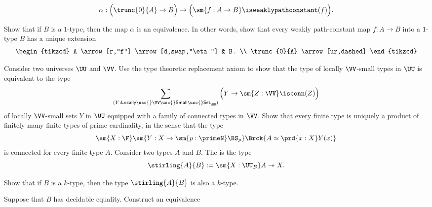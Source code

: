\begin{exercises}
\begin{subexenum}
    \begin{equation*}
      \alpha : \Big(\trunc{0}{A}\to B\Big)\to\Big(\sm{f:A\to B}\isweaklypathconstant(f)\Big).
    \end{equation*}
  \item Show that if $B$ is a $1$-type, then the map $\alpha$ is an equivalence. In other words, show that every weakly path-constant map $f:A\to B$ into a $1$-type $B$ has a unique extension
    \begin{equation*}
      \begin{tikzcd}
        A \arrow[r,"f"] \arrow[d,swap,"\eta"] & B. \\
        \trunc{0}{A} \arrow[ur,dashed]
      \end{tikzcd}
    \end{equation*}
  \end{subexenum}
  \exitem Consider two universes $\UU$ and $\VV$. Use the type theoretic replacement axiom to show that the type of locally $\VV$-small types in $\UU$ is equivalent to the type
  \begin{equation*}
    \sum_{(Y:\mathsf{Locally\usc{}}\VV\mathsf{\usc{}Small\usc{}Set}_\UU)}\Big(Y\to \sm{Z:\VV}\isconn(Z)\Big)
  \end{equation*}
  of locally $\VV$-small sets $Y$ in $\UU$ equipped with a family of connected types in $\VV$.
  \exitem Show that every finite type is uniquely a product of finitely many finite types of prime cardinality, in the sense that the type
  \begin{equation*}
    \sm{X:\F}\sm{Y:X\to\sm{p:\primeN}\BS_p}\Brck{A\simeq\prd{x:X}Y(x)}
  \end{equation*}
  is connected for every finite type $A$.
  \exitem \label{ex:stirling-type-of-the-second-kind}Consider two types $A$ and $B$. The  is the type
  \begin{equation*}
    \stirling{A}{B}:=\sm{X:\UU_B}A\twoheadrightarrow X. 
  \end{equation*}
  \begin{subexenum}
  \item Show that if $B$ is a $k$-type, then the type $\stirling{A}{B}$ is also a $k$-type.
  \item Suppose that $B$ has decidable equality. Construct an equivalence

\end{subexenum}
\end{exercises}
